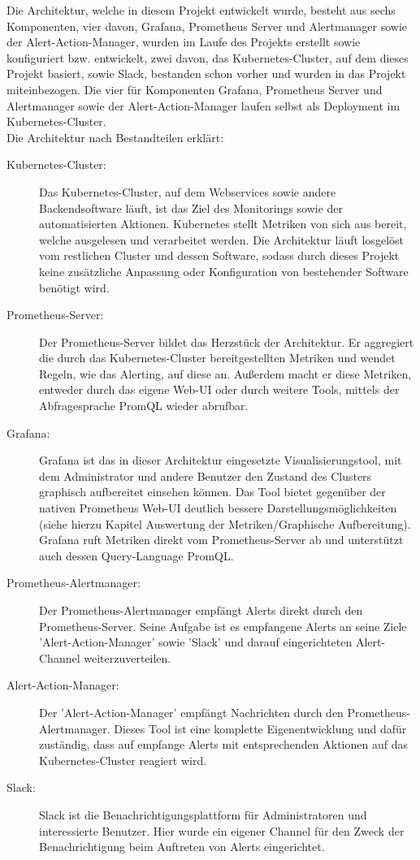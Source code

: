 \documentclass[a4paper,10pt]{scrartcl}
\begin{document}
Die Architektur, welche in diesem Projekt entwickelt wurde, besteht aus sechs Komponenten, vier davon, Grafana, Prometheus Server und Alertmanager sowie der Alert-Action-Manager, wurden im Laufe des Projekts erstellt sowie konfiguriert bzw. entwickelt, zwei davon, das Kubernetes-Cluster, auf dem dieses Projekt basiert, sowie Slack, bestanden schon vorher und wurden in das Projekt miteinbezogen. Die vier für Komponenten Grafana, Prometheus Server und Alertmanager sowie der Alert-Action-Manager laufen selbst als Deployment im Kubernetes-Cluster.\\
Die Architektur nach Bestandteilen erklärt:\\
\begin{description}
\item[Kubernetes-Cluster:]
Das Kubernetes-Cluster, auf dem Webservices sowie andere Backendsoftware läuft, ist das Ziel des Monitorings sowie der automatisierten Aktionen. Kubernetes stellt Metriken von sich aus bereit, welche ausgelesen und verarbeitet werden. Die Architektur läuft losgelöst vom restlichen Cluster und dessen Software, sodass durch dieses Projekt keine zusätzliche Anpassung oder Konfiguration von bestehender Software benötigt wird.
\item[Prometheus-Server:]
Der Prometheus-Server bildet das Herzstück der Architektur. Er aggregiert die durch das Kubernetes-Cluster bereitgestellten Metriken und wendet Regeln, wie das Alerting, auf diese an. Außerdem macht er diese Metriken, entweder durch das eigene Web-UI oder durch weitere Tools, mittels der Abfragesprache PromQL wieder abrufbar.
\item[Grafana:]
Grafana ist das in dieser Architektur eingesetzte Visualisierungstool, mit dem Administrator und andere Benutzer den Zustand des Clusters graphisch aufbereitet einsehen können. Das Tool bietet gegenüber der nativen Prometheus Web-UI deutlich bessere Darstellungsmöglichkeiten (siehe hierzu Kapitel Auswertung der Metriken/Graphische Aufbereitung). Grafana ruft Metriken direkt vom Prometheus-Server ab und unterstützt auch dessen Query-Language PromQL.
\item[Prometheus-Alertmanager:]
Der Prometheus-Alertmanager empfängt Alerts direkt durch den Prometheus-Server. Seine Aufgabe ist es empfangene Alerts an seine Ziele 'Alert-Action-Manager' sowie 'Slack' und darauf eingerichteten Alert-Channel weiterzuverteilen.
\item[Alert-Action-Manager:]
Der 'Alert-Action-Manager' empfängt Nachrichten durch den Prometheus-Alertmanager. Dieses Tool ist eine komplette Eigenentwicklung und dafür zuständig, dass auf empfange Alerts mit entsprechenden Aktionen auf das Kubernetes-Cluster reagiert wird.
\item[Slack:]
Slack ist die Benachrichtigungsplattform für Administratoren und interessierte Benutzer. Hier wurde ein eigener Channel für den Zweck der Benachrichtigung beim Auftreten von Alerts eingerichtet.

\end{description}
\end{document}

